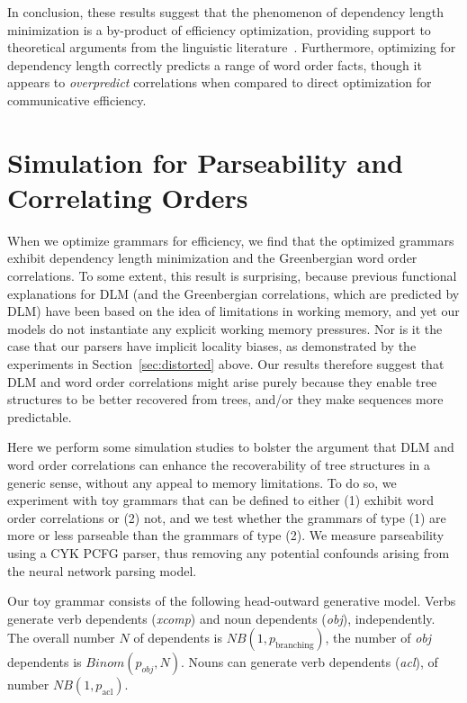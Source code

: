 \documentclass[10pt,twoside,lineno]{article}
\begin{document}
In conclusion, these results suggest that the phenomenon of dependency length minimization is a by-product of efficiency optimization, providing support to theoretical arguments from the linguistic literature~\cite{hawkins1994performance,futrell2017memory, futrell2017generalizing}.
Furthermore, optimizing for dependency length correctly predicts a range of word order facts, though it appears to \emph{overpredict} correlations when compared to direct optimization for communicative efficiency.






\section{Simulation for Parseability and Correlating Orders}

%

When we optimize grammars for efficiency, we find that the optimized grammars exhibit dependency length minimization and the Greenbergian word order correlations. To some extent, this result is surprising, because previous functional explanations for DLM (and the Greenbergian correlations, which are predicted by DLM) have been based on the idea of limitations in working memory, and yet our models do not instantiate any explicit working memory pressures. Nor is it the case that our parsers have implicit locality biases, as demonstrated by the experiments in Section~\ref{sec:distorted} above. Our results therefore suggest that DLM and word order correlations might arise purely because they enable tree structures to be better recovered from trees, and/or they make sequences more predictable. 

Here we perform some simulation studies to bolster the argument that DLM and word order correlations can enhance the recoverability of tree structures in a generic sense, without any appeal to memory limitations. To do so, we experiment with toy grammars that can be defined to either (1) exhibit word order correlations or (2) not, and we test whether the grammars of type (1) are more or less parseable than the grammars of type (2). We measure parseability using a CYK PCFG parser, thus removing any potential confounds arising from the neural network parsing model.

Our toy grammar consists of the following head-outward generative model.
Verbs generate verb dependents (\emph{xcomp}) and noun dependents (\emph{obj}), independently.
The overall number $N$ of dependents is $NB(1, p_\text{branching})$, the number of \emph{obj} dependents is $Binom(p_{obj}, N)$.
Nouns can generate verb dependents (\emph{acl}), of number $NB(1, p_\text{acl})$.
\end{document}
